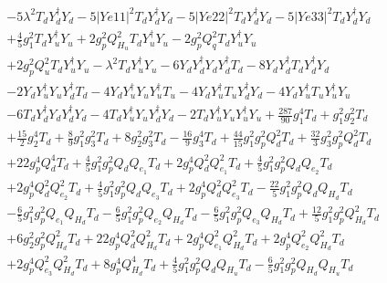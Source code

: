 {\begin{align}
 &-5 \lambda^{2} {T_d  Y_{d}^{\dagger}  Y_d} -5 |Ye11|^2 {T_d  Y_{d}^{\dagger}  Y_d} -5 |Ye22|^2 {T_d  Y_{d}^{\dagger}  Y_d} -5 |Ye33|^2 {T_d  Y_{d}^{\dagger}  Y_d} \nonumber \\ 
 &+\frac{4}{5} g_{1}^{2} {T_d  Y_{u}^{\dagger}  Y_u} +2 g_{p}^{2} Q_{H_u}^{2} {T_d  Y_{u}^{\dagger}  Y_u} -2 g_{p}^{2} Q_{q}^{2} {T_d  Y_{u}^{\dagger}  Y_u} \nonumber \\ 
 &+2 g_{p}^{2} Q_{u}^{2} {T_d  Y_{u}^{\dagger}  Y_u} - \lambda^{2} {T_d  Y_{u}^{\dagger}  Y_u} -6 {Y_d  Y_{d}^{\dagger}  Y_d  Y_{d}^{\dagger}  T_d} -8 {Y_d  Y_{d}^{\dagger}  T_d  Y_{d}^{\dagger}  Y_d} \nonumber \\ 
 &-2 {Y_d  Y_{u}^{\dagger}  Y_u  Y_{d}^{\dagger}  T_d} -4 {Y_d  Y_{u}^{\dagger}  Y_u  Y_{u}^{\dagger}  T_u} -4 {Y_d  Y_{u}^{\dagger}  T_u  Y_{d}^{\dagger}  Y_d} -4 {Y_d  Y_{u}^{\dagger}  T_u  Y_{u}^{\dagger}  Y_u} \nonumber \\ 
 &-6 {T_d  Y_{d}^{\dagger}  Y_d  Y_{d}^{\dagger}  Y_d} -4 {T_d  Y_{u}^{\dagger}  Y_u  Y_{d}^{\dagger}  Y_d} -2 {T_d  Y_{u}^{\dagger}  Y_u  Y_{u}^{\dagger}  Y_u} +\frac{287}{90} g_{1}^{4} T_d +g_{1}^{2} g_{2}^{2} T_d \nonumber \\ 
 &+\frac{15}{2} g_{2}^{4} T_d +\frac{8}{9} g_{1}^{2} g_{3}^{2} T_d +8 g_{2}^{2} g_{3}^{2} T_d -\frac{16}{9} g_{3}^{4} T_d +\frac{44}{15} g_{1}^{2} g_{p}^{2} Q_{d}^{2} T_d +\frac{32}{3} g_{3}^{2} g_{p}^{2} Q_{d}^{2} T_d \nonumber \\ 
 &+22 g_{p}^{4} Q_{d}^{4} T_d +\frac{4}{5} g_{1}^{2} g_{p}^{2} Q_{d} Q_{e_{1}} T_d +2 g_{p}^{4} Q_{d}^{2} Q_{e_{1}}^{2} T_d +\frac{4}{5} g_{1}^{2} g_{p}^{2} Q_{d} Q_{e_{2}} T_d \nonumber \\ 
 &+2 g_{p}^{4} Q_{d}^{2} Q_{e_{2}}^{2} T_d +\frac{4}{5} g_{1}^{2} g_{p}^{2} Q_{d} Q_{e_3} T_d +2 g_{p}^{4} Q_{d}^{2} Q_{e_3}^{2} T_d -\frac{22}{5} g_{1}^{2} g_{p}^{2} Q_{d} Q_{H_d} T_d \nonumber \\ 
 &-\frac{6}{5} g_{1}^{2} g_{p}^{2} Q_{e_{1}} Q_{H_d} T_d -\frac{6}{5} g_{1}^{2} g_{p}^{2} Q_{e_{2}} Q_{H_d} T_d -\frac{6}{5} g_{1}^{2} g_{p}^{2} Q_{e_3} Q_{H_d} T_d +\frac{12}{5} g_{1}^{2} g_{p}^{2} Q_{H_d}^{2} T_d \nonumber \\ 
 &+6 g_{2}^{2} g_{p}^{2} Q_{H_d}^{2} T_d +22 g_{p}^{4} Q_{d}^{2} Q_{H_d}^{2} T_d +2 g_{p}^{4} Q_{e_{1}}^{2} Q_{H_d}^{2} T_d +2 g_{p}^{4} Q_{e_{2}}^{2} Q_{H_d}^{2} T_d \nonumber \\ 
 &+2 g_{p}^{4} Q_{e_3}^{2} Q_{H_d}^{2} T_d +8 g_{p}^{4} Q_{H_d}^{4} T_d +\frac{4}{5} g_{1}^{2} g_{p}^{2} Q_{d} Q_{H_u} T_d -\frac{6}{5} g_{1}^{2} g_{p}^{2} Q_{H_d} Q_{H_u} T_d \nonumber \\ 

\end{align}}
